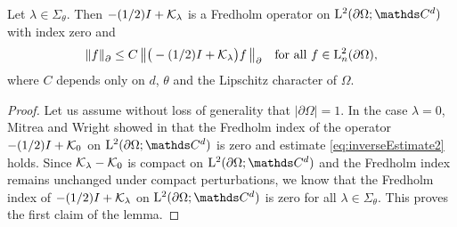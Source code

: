 \begin{lem}
  \label{lem:inverseEstimate}
  Let $\lambda \in \Sigma_\theta$.
  Then $-(1/2)I + \mathcal{K}_\lambda$ is a Fredholm operator on $\Ell^2(\partial\Omega; \C^d)$ with index zero and
  \begin{align}
    \label{eq:inverseEstimate2}
    \| f\|^{}_\partial \leq C \, \big\| \big( - (1/2) I + \mathcal{K}_\lambda \big) f\, \big\|^{}_\partial \quad\text{for all } f \in \mathrm{L}^2_n(\partial\Omega),
  \end{align}
  where $C$ depends only on $d$, $\theta$ and the Lipschitz character of $\Omega$.
\end{lem}

\begin{proof}
  Let us assume without loss of generality that $|\partial\Omega| = 1$.
  In the case $\lambda = 0$, Mitrea and Wright showed in \cite[Eq. (5.166)]{mitreaWright} that the Fredholm index of the operator $-(1/2)I + \mathcal{K}_0$ on $\Ell^2(\partial\Omega; \C^d)$ is zero and estimate \eqref{eq:inverseEstimate2} holds.
  Since $\mathcal{K}_\lambda - \mathcal{K}_0$ is compact on $\Ell^2(\partial\Omega; \C^d)$ and the Fredholm index remains unchanged under compact perturbations, we know that the Fredholm index of $-(1/2)I + \mathcal{K}_\lambda$ on $\Ell^2(\partial\Omega; \C^d)$ is zero for all $\lambda \in \Sigma_\theta$.
  This proves the first claim of the lemma.


\end{proof}
